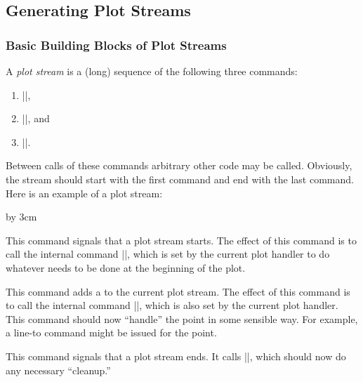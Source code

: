 \subsection{Generating Plot Streams}

\subsubsection{Basic Building Blocks of Plot Streams}
A \emph{plot stream} is a (long) sequence of the following three
commands:
\begin{enumerate}
\item
  |\pgfplotstreamstart|,
\item
  |\pgfplotstreampoint|, and
\item
  |\pgfplotstreamend|.
\end{enumerate}
Between calls of these commands arbitrary other code may be
called. Obviously, the stream should start with the first command and
end with the last command. Here is an example of a plot stream:
\begin{codeexample}
\pgfplotstreamstart
\pgfplotstreampoint{\pgfpoint{1cm}{1cm}}
\newdimen\mydim
\mydim=2cm
\pgfplotstreampoint{\pgfpoint{\mydim}{2cm}}
\advance \mydim by 3cm
\pgfplotstreampoint{\pgfpoint{\mydim}{2cm}}
\pgfplotstreamend
\end{codeexample}

\begin{command}{\pgfplotstreamstart}
  This command signals that a plot stream starts. The effect of this
  command is to call the internal command |\pgf@plotstreamstart|,
  which is set by the current plot handler to do whatever needs to be
  done at the beginning of the plot.
\end{command}

\begin{command}{\pgfplotstreampoint{}}
  This command adds a  to the current plot stream. The
  effect of this command is to call the internal command |\pgf@plotstreampoint|,
  which is also set by the current plot handler. This command should
  now ``handle'' the point in some sensible way. For example, a
  line-to command might be issued for the point.
\end{command}

\begin{command}{\pgfplotstreamend}
  This command signals that a plot stream ends. It calls
  |\pgf@plotstreamend|, which should now do any necessary ``cleanup.''
\end{command}

